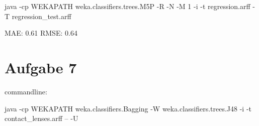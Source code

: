 java -cp WEKAPATH weka.classifiers.trees.M5P -R -N -M 1 -i -t regression.arff -T regression\_test.arff


MAE: 0.61 
RMSE: 0.64 


\section{Aufgabe 7}

commandline: 

java -cp WEKAPATH weka.classifiers.Bagging -W weka.classifiers.trees.J48 -i -t contact\_lenses.arff -- -U






